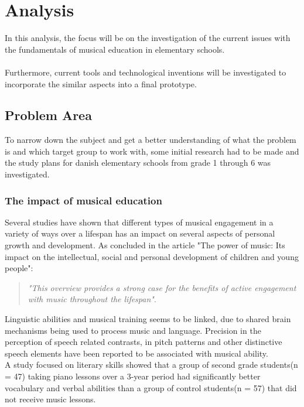 \chapter{Analysis}
In this analysis, the focus will be on the investigation of the current issues with the fundamentals of musical education in elementary schools.\\
\\
Furthermore, current tools and technological inventions will be investigated to incorporate the similar aspects into a final prototype.

\section{Problem Area}
	To narrow down the subject and get a better understanding of what the problem is and which target group to work with, some initial research had to be made and the study plans for danish elementary schools from grade 1 through 6 was investigated.\\
	
	\subsection{The impact of musical education}
	Several studies have shown that different types of musical engagement in a variety of ways over a lifespan has an impact on several aspects of personal growth and development. As concluded in the article "The power of music: Its impact on the intellectual, social and personal development of children and young people":\\
	
	\begin{quote}
		\textit{"This overview provides a strong case for the benefits of active engagement with music throughout the lifespan"}\cite{powerOfMusic}\label{quote:powerOfMusic}.\\
	\end{quote}
	
	Linguistic abilities and musical training seems to be linked, due to shared brain mechanisms being used to process music and language. Precision in the perception of speech related contrasts, in pitch patterns and other distinctive speech elements have been reported to be associated with musical ability\cite{languageSkills}.\\
	
	A study focused on literary skills showed that a group of second grade students(n = 47) taking piano lessons over a 3-year period had significantly better vocabulary and verbal abilities than a group of control students(n = 57) that did not receive music lessons\cite{vocabularySkills}.\\
	
